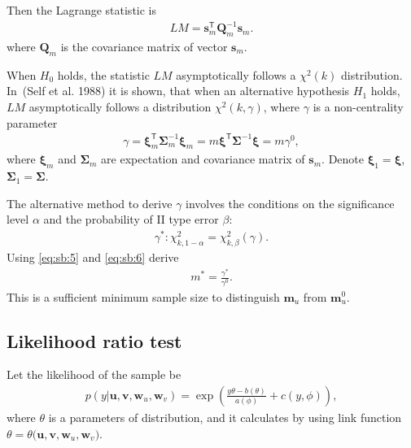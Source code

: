 \documentclass[
11pt,%
tightenlines,%
twoside,%
onecolumn,%
nofloats,%
nobibnotes,%
nofootinbib,%
superscriptaddress,%
noshowpacs,%
centertags]%
{revtex4}
\begin{document}
Then the Lagrange statistic is
\begin{equation}
\label{eq:sb:4}
\begin{aligned}
	LM = \textbf{s}^{\mathsf{T}}_{m}\textbf{Q}_{m}^{-1}\textbf{s}_{m}.
\end{aligned}
\end{equation}
where $\textbf{Q}_{m}$ is the covariance matrix of vector $\textbf{s}_{m}$.
	
When $H_0$ holds, the statistic $LM$ asymptotically follows a $\chi^2(k)$ distribution.  In~(Self et al. 1988) it is shown, that when an alternative hypothesis $H_1$ holds,  $LM$ asymptotically follows a distribution $\chi^2(k,\gamma)$, where $\gamma$ is a non-centrality parameter
\begin{equation}
\label{eq:sb:5}
\begin{aligned}
	\gamma = \bm{\xi}_{m}^{\mathsf{T}}\bm{\Sigma}^{-1}_{m}\bm{\xi}_{m} = m\bm{\xi}^{\mathsf{T}}\bm{\Sigma}^{-1}\bm{\xi}= m\gamma^0,
\end{aligned}
\end{equation}
where $\bm{\xi}_{m}$ and $\bm{\Sigma}_{m}$ are expectation and covariance matrix of $\textbf{s}_{m}$. Denote $\bm{\xi}_1 = \bm{\xi}$,  $\bm{\Sigma}_1 = \bm{\Sigma}$. 
	
The alternative method to derive $\gamma$ involves the conditions on the significance level $\alpha$ and the probability of II type error $\beta$:
\begin{equation}
\label{eq:sb:6}
\begin{aligned}
	\gamma^*:\chi^2_{k, 1-\alpha} = \chi^2_{k, \beta}\left(\gamma\right).
\end{aligned}
\end{equation}
Using \eqref{eq:sb:5} and \eqref{eq:sb:6} derive
\begin{equation}
\label{eq:sb:7}
\begin{aligned}
	m^* = \frac{\gamma^*}{\gamma^0}.
\end{aligned}
\end{equation}
This is a sufficient minimum sample size to distinguish $\textbf{m}_{u}$ from $\textbf{m}^0_{u}$.

\subsection{Likelihood ratio test}\label{likelihood_test}
Let the likelihood of the sample be
\begin{equation}
\label{eq:sb:8}
\begin{aligned}
	p(y|\textbf{u},\textbf{v},\textbf{w}_{u},\textbf{w}_{v}) = \exp\left(\frac{y\theta- b(\theta)}{a(\phi)} + c\left(y, \phi\right)\right),
\end{aligned}
\end{equation}
where $\theta$ is a parameters of distribution, and it calculates by using link function $\theta=\theta\bigr(\textbf{u},\textbf{v},\textbf{w}_{u},\textbf{w}_{v}\bigr)$.
\end{document}
